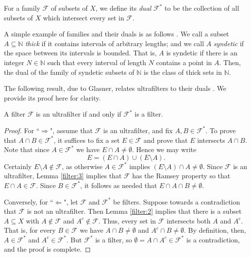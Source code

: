 For a family \( \mathcal{F}  \) of subsets of \( X \), we define its \emph{dual} \( \mathcal{F} ^{\ast}  \) to be the collection of all subsets of \( X \) which intersect every set in \( \mathcal{F}  \).

A simple example of families and their duals is as follows \cite{brian:2016}. We call a subset \( A \subseteq \mathbb{N}  \) \emph{thick} if it contains intervals of arbitrary lengths; and we call \( A \) \emph{syndetic} if the space between its intervals is bounded. That is, \( A \) is syndetic if there is an integer \( N \in \mathbb{N}  \) such that every interval of length \( N \) contains a point in \( A \). Then, the dual of the family of syndetic subsets of \( \mathbb{N} \) is the class of thick sets in \( \mathbb{N}  \).

The following result, due to Glasner, relates ultrafilters to their duals \cite{glasner:1980}. We provide its proof here for clarity.

\begin{lemma}
\label{filter:4}
A filter \( \mathcal{F}  \) is an ultrafilter if and only if \( \mathcal{F} ^{\ast}  \) is a filter.
\end{lemma}
\begin{proof}
	For ``$\Rightarrow$", assume that \( \mathcal{F}  \) is an ultrafilter, and fix \( A,B \in \mathcal{F} ^{\ast}  \). To prove that \( A \cap B \in \mathcal{F} ^{\ast}  \), it suffices to fix a set \( E \in \mathcal{F}  \) and prove that \( E \) intersects \( A \cap B \). Note that since \( A \in \mathcal{F} ^{\ast}  \) we have \( E \cap A \neq \emptyset  \). Hence we may write \[ E = (E \cap A) \cup (E \setminus A). \] Certainly \( E \setminus A \notin \mathcal{F}  \), as otherwise \( A \in \mathcal{F} ^{\ast}  \) implies \( (E\setminus A) \cap A \neq \emptyset \). Since \( \mathcal{F}  \) is an ultrafilter, Lemma \ref{filter:3} implies that \( \mathcal{F}  \) has the Ramsey property so that \( E \cap A \in \mathcal{F}  \). Since \( B \in \mathcal{F} ^{\ast}  \), it follows as needed that \( E \cap A \cap B \neq \emptyset  \).

	Conversely, for ``$\Leftarrow$", let \( \mathcal{F}  \) and \( \mathcal{F} ^{\ast}  \) be filters. Suppose towards a contradiction that \( \mathcal{F}  \) is not an ultrafilter. Then Lemma \ref{filter:2} implies that there is a subset \( A \subseteq X \) with \( A \notin \mathcal{F}  \) and \( A^{c} \notin \mathcal{F}  \). Thus, every set in \( \mathcal{F}  \) intersects both \( A \) and \( A^{c}  \). That is, for every \( B \in \mathcal{F}  \) we have \( A \cap B \neq \emptyset  \) and \( A^{c} \cap B \neq \emptyset  \). By definition, then, \( A \in \mathcal{F}^{\ast}   \) and \( A^{c} \in \mathcal{F} ^{\ast}  \). But \( \mathcal{F} ^{\ast}  \) is a filter, so \( \emptyset = A \cap A^{c} \in \mathcal{F} ^{\ast}  \) is a contradiction, and the proof is complete.
\end{proof}
